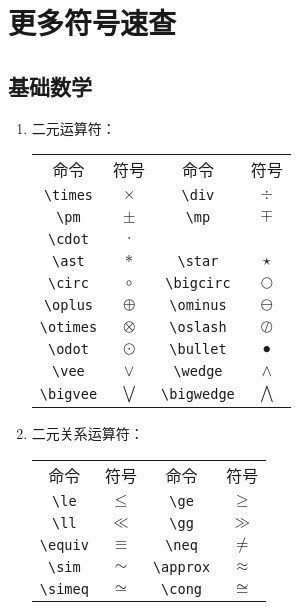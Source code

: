 \section{更多符号速查}

\subsection{基础数学}
\begin{multicols}{2}
\begin{enumerate}

\item 二元运算符：

\begin{center}
\begin{tabular}{cccc}
命令 & 符号 & 命令 & 符号 \\
\verb|\times| & $\times$ & \verb|\div| & $\div$ \\ 
\verb|\pm| & $\pm$ & \verb|\mp| & $\mp$ \\
\verb|\cdot| & $\cdot$ & \\
\verb|\ast| & $\ast$ & \verb|\star| & $\star$ \\
\verb|\circ| & $\circ$ & \verb|\bigcirc| & $\bigcirc$ \\
\verb|\oplus| & $\oplus$ & \verb|\ominus| & $\ominus$ \\ 
\verb|\otimes| & $\otimes$ & \verb|\oslash| & $\oslash$ \\ 
\verb|\odot| & $\odot$ & \verb|\bullet| & $\bullet$ \\ 
\verb|\vee| & $\vee$ & \verb|\wedge| & $\wedge$ \\ 
\verb|\bigvee| & $\bigvee$ & \verb|\bigwedge| & $\bigwedge$ \\ 
\end{tabular}
\end{center}

\item 二元关系运算符：

\begin{center}
\begin{tabular}{cccc}
命令 & 符号 & 命令 & 符号 \\
\verb|\le| & $\le$ & \verb|\ge| & $\ge$ \\
\verb|\ll| & $\ll$ & \verb|\gg| & $\gg$ \\ 
\verb|\equiv| & $\equiv$ & \verb|\neq| & $\neq$ \\ 
\verb|\sim| & $\sim$ & \verb|\approx| & $\approx$ \\
\verb|\simeq| & $\simeq$ & \verb|\cong| & $\cong$ \\ 
\end{tabular}
\end{center}


\end{enumerate}
\end{multicols}
